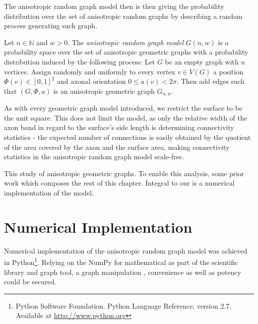 The anisotropic random graph model then is then giving the probability
distribution over the set of anisotropic random graphs by describing a
random process generating such graph.

\begin{definition}
  Let $n \in \mathbb{N}$ and $w > 0$. The \textit{anisotropic random
    graph model} $G(n,w)$ is a probability space over the set of
  anisotropic geometric graphs with a probability distribution induced
  by the following process: Let $G$ be an empty graph with $n$
  vertices. Assign randomly and uniformly to every vertex $v \in V(G)$
  a position $\Phi(v) \in [0,1]^2$ and axonal orientation $0\leq a(v)
  < 2\pi$. Then add edges such that $(G,\Phi,a)$ is an anisotropic
  geometric graph $G_{n,w}$.
\end{definition}


As with every geometric graph model introduced, we restrict the
surface to be the unit square. This does not limit the model, as only
the relative width of the axon band in regard to the surface's side
length is determining connectivity statistics -
the expected number of connections is easily obtained by the quotient
of the area covered by the axon and the surface area, making
connectivity statistics in the anisotropic random graph model
scale-free.

This study of anisotropic geometric graphs. To enable
this analysis, some prior work which composes the rest of this
chapter. Integral to our is a numerical implementation of the model. 







\section{Numerical Implementation}\label{numerical_implementation}

Numerical implementation of the anisotropic random graph model was
achieved in Python\footnote{Python Software Foundation. Python
  Language Reference, version 2.7. Available at
  \url{http://www.python.org}}. Relying on the NumPy for mathematical
as part of the scientific library \parencite{scipy} %
and graph tool, a graph manipulation \parencite{graph_tool},
convenience as well as potency could be secured.


